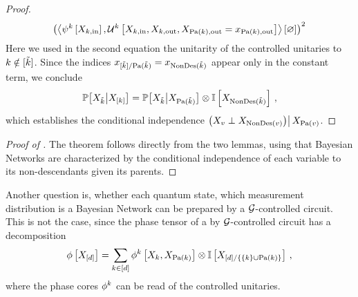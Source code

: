 \begin{proof}
\begin{align*}
        \left(\left\langle \psi^{k}\left[X_{k,\mathrm{in}}\right],\mathcal{U}^{k}\left[X_{k,\mathrm{in}},X_{k,\mathrm{out}},X_{\mathrm{Pa}(k),\mathrm{out}}=x_{\mathrm{Pa}(k),\mathrm{out}}\right]\right\rangle \left[ \varnothing \right]\right)^2
    \end{align*}
    Here we used in the second equation the unitarity of the controlled unitaries to $k\notin[\tilde{k}]$.
    Since the indices $x_{[\tilde{k}]/\mathrm{Pa}(\tilde{k})} = x_{\mathrm{NonDes}(\tilde{k})}$ appear only in the constant term, we conclude
    \begin{align*}
        \mathbb{P}\big[X_{\tilde{k}}\big|X_{[k]}\big] = \mathbb{P}\big[X_{\tilde{k}}\big|X_{\mathrm{Pa}(\tilde{k})}\big] \otimes \mathbb{I}\left[X_{\mathrm{NonDes}(\tilde{k})}\right]\, ,
    \end{align*}
    which establishes the conditional independence $\left(X_{v}\perp X_{\mathrm{NonDes}(v)}\middle)\right| X_{\mathrm{Pa}(v)}$.
\end{proof}

\begin{proof}[Proof of ]
    The theorem follows directly from the two lemmas, using that Bayesian Networks are characterized by the conditional independence of each variable to its non-descendants given its parents.
\end{proof}


Another question is, whether each quantum state, which measurement distribution is a Bayesian Network can be prepared by a $\mathcal{G}$-controlled circuit.
This is not the case, since the phase tensor of a by $\mathcal{G}$-controlled circuit has a decomposition
\begin{align*}
    \phi\left[X_{[d]}\right]
    = \sum_{k\in[d]} \phi^{k}\left[X_{k},X_{\mathrm{Pa}(k)}\right] \otimes \mathbb{I}\left[X_{[d]/\{\{k\}\cup\mathrm{Pa}(k)\}}\right] \, ,
\end{align*}
where the phase cores $\phi^{k}$ can be read of the controlled unitaries.